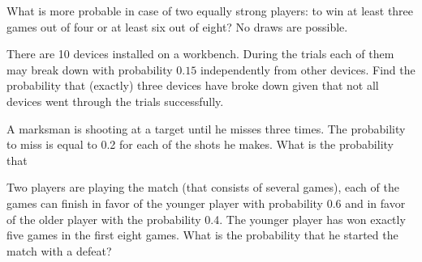 \documentclass[14pt]{exam}
\begin{document}
\begin{questions}
		\question
		What is more probable in case of two equally strong players: to win at least three games out of four or at least six out of eight? No draws are possible.

		
		\question
		There are 10 devices installed on a workbench. During the trials each of them may break down with probability $0.15$ independently from other devices. Find the probability that (exactly) three devices have broke down given that not all devices went through the trials successfully.
		
		
		
		\question
		A marksman is shooting at a target until he misses three times. The probability to miss is equal to 0.2 for each of the shots he makes. What is the probability that
		
		

		
		\question
		Two players are playing the match (that consists of several games), each of the games can finish in favor of the younger player with probability 0.6 and in favor of the older player with the probability 0.4. The younger player has won exactly five games in the first eight games. What is the probability that he started the match with a defeat?
 	\end{questions}
 	
 	
 	
 	
 	\pagebreak
\end{document}
